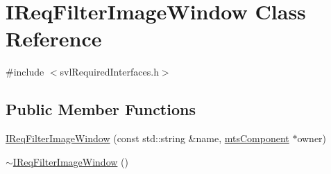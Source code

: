 \hypertarget{class_i_req_filter_image_window}{}\section{I\+Req\+Filter\+Image\+Window Class Reference}
\label{class_i_req_filter_image_window}


{\ttfamily \#include $<$svl\+Required\+Interfaces.\+h$>$}

\subsection*{Public Member Functions}
\begin{DoxyCompactItemize}
\item 
\hyperlink{class_i_req_filter_image_window_a8b35a80a3c595aa512d9854c11dba249}{I\+Req\+Filter\+Image\+Window} (const std\+::string \&name, \hyperlink{classmts_component}{mts\+Component} $\ast$owner)
\item 
\hyperlink{class_i_req_filter_image_window_a5f306d705296094d03f5bded846f063b}{$\sim$\+I\+Req\+Filter\+Image\+Window} ()
\end{DoxyCompactItemize}
